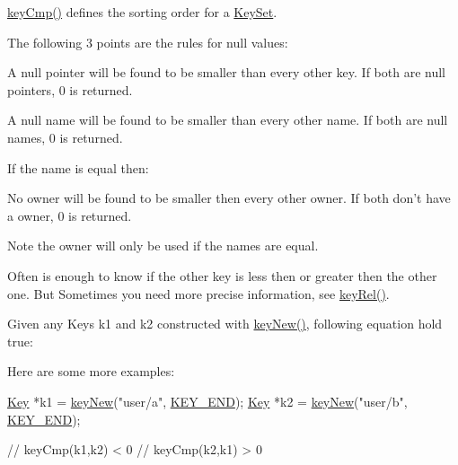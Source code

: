\hyperlink{group__keytest_gaf6e66e12fe04d535a5d1c8218ced803e}{key\-Cmp()} defines the sorting order for a \hyperlink{classkdb_1_1KeySet}{Key\-Set}.

The following 3 points are the rules for null values\-:


\begin{DoxyItemize}
\item A null pointer will be found to be smaller than every other key. If both are null pointers, 0 is returned.
\end{DoxyItemize}


\begin{DoxyItemize}
\item A null name will be found to be smaller than every other name. If both are null names, 0 is returned.
\end{DoxyItemize}

If the name is equal then\-:


\begin{DoxyItemize}
\item No owner will be found to be smaller then every other owner. If both don't have a owner, 0 is returned.
\end{DoxyItemize}

\begin{DoxyNote}{Note}
the owner will only be used if the names are equal.
\end{DoxyNote}
Often is enough to know if the other key is less then or greater then the other one. But Sometimes you need more precise information, see \hyperlink{group__keytest_ga6bb0f95ac34ce9c42d61bb35a76139d0}{key\-Rel()}.

Given any Keys k1 and k2 constructed with \hyperlink{group__key_gad23c65b44bf48d773759e1f9a4d43b89}{key\-New()}, following equation hold true\-:


\begin{DoxyCodeInclude}
\end{DoxyCodeInclude}
 Here are some more examples\-: 
\begin{DoxyCode}
\hyperlink{classkdb_1_1Key_a5679f5cae63caddd64a60388b9cc77fa}{Key} *k1 = \hyperlink{group__key_gad23c65b44bf48d773759e1f9a4d43b89}{keyNew}(\textcolor{stringliteral}{"user/a"}, \hyperlink{group__key_gga91fb3178848bd682000958089abbaf40aa8adb6fcb92dec58fb19410eacfdd403}{KEY\_END});
\hyperlink{classkdb_1_1Key_a5679f5cae63caddd64a60388b9cc77fa}{Key} *k2 = \hyperlink{group__key_gad23c65b44bf48d773759e1f9a4d43b89}{keyNew}(\textcolor{stringliteral}{"user/b"}, \hyperlink{group__key_gga91fb3178848bd682000958089abbaf40aa8adb6fcb92dec58fb19410eacfdd403}{KEY\_END});

\textcolor{comment}{// keyCmp(k1,k2) < 0}
\textcolor{comment}{// keyCmp(k2,k1) > 0}
\end{DoxyCode}



